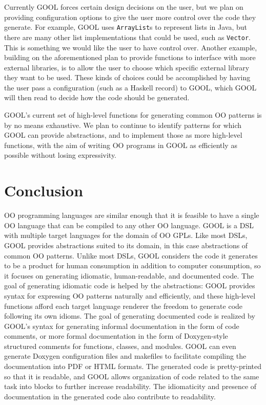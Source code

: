 \documentclass[sigplan,review,anonymous,prologue,dvipsnames]{acmart}
\begin{document}
Currently GOOL forces certain design decisions on the user, but we plan on
providing configuration options to give the user more control over the code
they generate. For example, GOOL uses \verb|ArrayList|s to represent lists in
Java, but there are many other list implementations that could be used, such as
\verb|Vector|. This is something we would like the user to have control over.
Another example, building on the aforementioned plan to provide functions to
interface with more external libraries, is to allow the user to choose which
specific external library they want to be used. These kinds of choices could be
accomplished by having the user pass a configuration (such as a Haskell record)
to GOOL, which GOOL will then read to decide how the code should be generated.

GOOL's current set of high-level functions for generating common OO patterns is
by no means exhaustive. We plan to continue to identify patterns for which GOOL
can provide abstractions, and to implement those as more high-level functions,
with the aim of writing OO programs in GOOL as efficiently as possible without
losing expressivity.

\section{Conclusion} \label{sec:conclusions}

OO programming languages are similar enough that it is feasible to have a
single OO language that can be compiled to any other OO language. GOOL is a DSL
with multiple target languages for the domain of OO GPLs. Like most DSLs, GOOL
provides abstractions suited to its domain, in this case abstractions of common
OO patterns. Unlike most DSLs, GOOL considers the code it generates to be a
product for human consumption in addition to computer consumption, so it
focuses on generating idiomatic, human-readable, and documented code. The goal
of generating idiomatic code is helped by the abstractions: GOOL provides
syntax for expressing OO patterns naturally and efficiently, and these
high-level functions afford each target language renderer the freedom to
generate code following its own idioms. The goal of generating documented code
is realized by GOOL's syntax for generating informal documentation in the form
of code comments, or more formal documentation in the form of Doxygen-style
structured comments for functions, classes, and modules. GOOL can even generate
Doxygen configuration files and makefiles to facilitate compiling the
documentation into PDF or HTML formats. The generated code is pretty-printed so
that it is readable, and GOOL allows organization of code related to the same
task into blocks to further increase readability. The idiomaticity and presence
of documentation in the generated code also contribute to readability.
\end{document}

